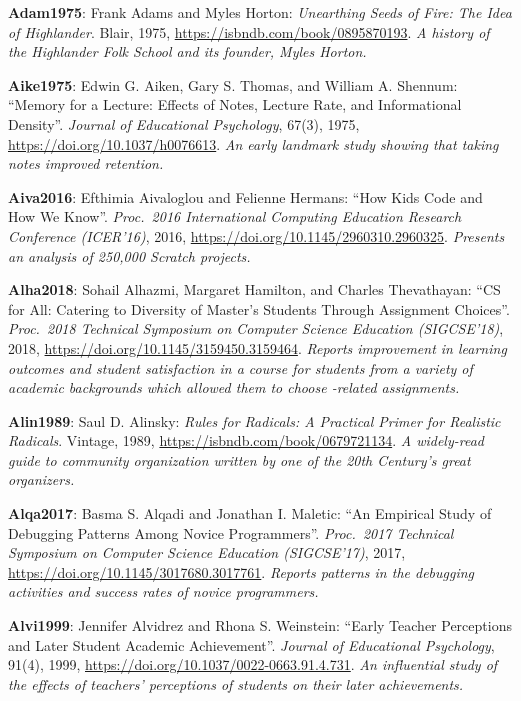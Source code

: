\textbf{\hypertarget{b:Adam1975}{Adam1975}\label{b:Adam1975}}: Frank Adams and Myles Horton: \emph{Unearthing Seeds of Fire: The Idea of Highlander}. Blair, 1975, \url{https://isbndb.com/book/0895870193}. \emph{A history of the Highlander Folk School and its founder, Myles Horton.}

\textbf{\hypertarget{b:Aike1975}{Aike1975}\label{b:Aike1975}}: Edwin G. Aiken, Gary S. Thomas, and William A. Shennum: ``Memory for a Lecture: Effects of Notes, Lecture Rate, and Informational Density''. \emph{Journal of Educational Psychology}, 67(3), 1975, \url{https://doi.org/10.1037/h0076613}. \emph{An early landmark study showing that taking notes improved retention.}

\textbf{\hypertarget{b:Aiva2016}{Aiva2016}\label{b:Aiva2016}}: Efthimia Aivaloglou and Felienne Hermans: ``How Kids Code and How We Know''. \emph{Proc.\ 2016 International Computing Education Research Conference (ICER'16)}, 2016, \url{https://doi.org/10.1145/2960310.2960325}. \emph{Presents an analysis of 250,000 Scratch projects.}

\textbf{\hypertarget{b:Alha2018}{Alha2018}\label{b:Alha2018}}: Sohail Alhazmi, Margaret Hamilton, and Charles Thevathayan: ``CS for All: Catering to Diversity of Master's Students Through Assignment Choices''. \emph{Proc.\ 2018 Technical Symposium on Computer Science Education (SIGCSE'18)}, 2018, \url{https://doi.org/10.1145/3159450.3159464}. \emph{Reports improvement in learning outcomes and student satisfaction in a course for students from a variety of academic backgrounds which allowed them to choose -related assignments.}

\textbf{\hypertarget{b:Alin1989}{Alin1989}\label{b:Alin1989}}: Saul D. Alinsky: \emph{Rules for Radicals: A Practical Primer for Realistic Radicals}. Vintage, 1989, \url{https://isbndb.com/book/0679721134}. \emph{A widely-read guide to community organization written by one of the 20th Century's great organizers.}

\textbf{\hypertarget{b:Alqa2017}{Alqa2017}\label{b:Alqa2017}}: Basma S. Alqadi and Jonathan I. Maletic: ``An Empirical Study of Debugging Patterns Among Novice Programmers''. \emph{Proc.\ 2017 Technical Symposium on Computer Science Education (SIGCSE'17)}, 2017, \url{https://doi.org/10.1145/3017680.3017761}. \emph{Reports patterns in the debugging activities and success rates of novice programmers.}

\textbf{\hypertarget{b:Alvi1999}{Alvi1999}\label{b:Alvi1999}}: Jennifer Alvidrez and Rhona S. Weinstein: ``Early Teacher Perceptions and Later Student Academic Achievement''. \emph{Journal of Educational Psychology}, 91(4), 1999, \url{https://doi.org/10.1037/0022-0663.91.4.731}. \emph{An influential study of the effects of teachers' perceptions of students on their later achievements.}

